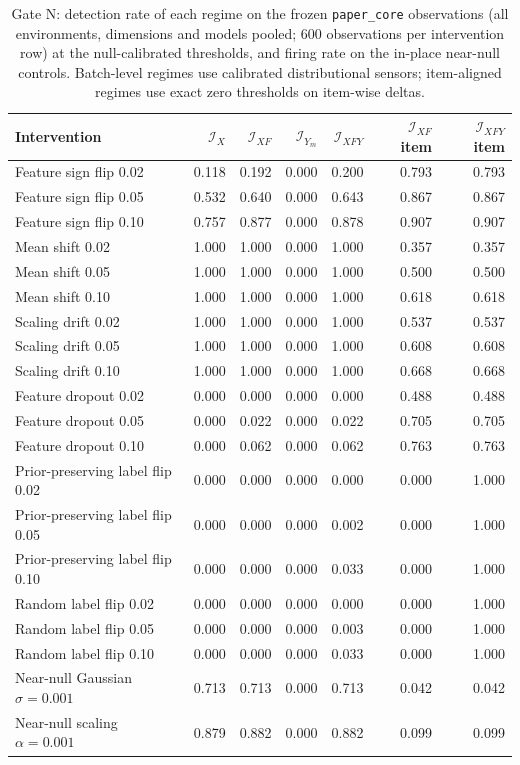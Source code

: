 \begin{table}[!t]
\caption{Gate N: detection rate of each regime on the frozen \texttt{paper\_core} observations (all environments, dimensions and models pooled; 600 observations per intervention row) at the null-calibrated thresholds, and firing rate on the in-place near-null controls. Batch-level regimes use calibrated distributional sensors; item-aligned regimes use exact zero thresholds on item-wise deltas.}
\label{tab:s-detection}
\centering
\footnotesize
\setlength{\tabcolsep}{5pt}
\begin{tabular}{@{}lrrrrrr@{}}
\toprule
Intervention & $\mathcal I_X$ & $\mathcal I_{XF}$ & $\mathcal I_{Y_m}$ & $\mathcal I_{XFY}$ & $\mathcal I_{XF}$ item & $\mathcal I_{XFY}$ item \\
\midrule
Feature sign flip 0.02 & 0.118 & 0.192 & 0.000 & 0.200 & 0.793 & 0.793 \\
Feature sign flip 0.05 & 0.532 & 0.640 & 0.000 & 0.643 & 0.867 & 0.867 \\
Feature sign flip 0.10 & 0.757 & 0.877 & 0.000 & 0.878 & 0.907 & 0.907 \\
Mean shift 0.02 & 1.000 & 1.000 & 0.000 & 1.000 & 0.357 & 0.357 \\
Mean shift 0.05 & 1.000 & 1.000 & 0.000 & 1.000 & 0.500 & 0.500 \\
Mean shift 0.10 & 1.000 & 1.000 & 0.000 & 1.000 & 0.618 & 0.618 \\
Scaling drift 0.02 & 1.000 & 1.000 & 0.000 & 1.000 & 0.537 & 0.537 \\
Scaling drift 0.05 & 1.000 & 1.000 & 0.000 & 1.000 & 0.608 & 0.608 \\
Scaling drift 0.10 & 1.000 & 1.000 & 0.000 & 1.000 & 0.668 & 0.668 \\
Feature dropout 0.02 & 0.000 & 0.000 & 0.000 & 0.000 & 0.488 & 0.488 \\
Feature dropout 0.05 & 0.000 & 0.022 & 0.000 & 0.022 & 0.705 & 0.705 \\
Feature dropout 0.10 & 0.000 & 0.062 & 0.000 & 0.062 & 0.763 & 0.763 \\
Prior-preserving label flip 0.02 & 0.000 & 0.000 & 0.000 & 0.000 & 0.000 & 1.000 \\
Prior-preserving label flip 0.05 & 0.000 & 0.000 & 0.000 & 0.002 & 0.000 & 1.000 \\
Prior-preserving label flip 0.10 & 0.000 & 0.000 & 0.000 & 0.033 & 0.000 & 1.000 \\
Random label flip 0.02 & 0.000 & 0.000 & 0.000 & 0.000 & 0.000 & 1.000 \\
Random label flip 0.05 & 0.000 & 0.000 & 0.000 & 0.003 & 0.000 & 1.000 \\
Random label flip 0.10 & 0.000 & 0.000 & 0.000 & 0.033 & 0.000 & 1.000 \\
\midrule
Near-null Gaussian $\sigma=0.001$ & 0.713 & 0.713 & 0.000 & 0.713 & 0.042 & 0.042 \\
Near-null scaling $\alpha=0.001$ & 0.879 & 0.882 & 0.000 & 0.882 & 0.099 & 0.099 \\
\bottomrule
\end{tabular}
\end{table}
